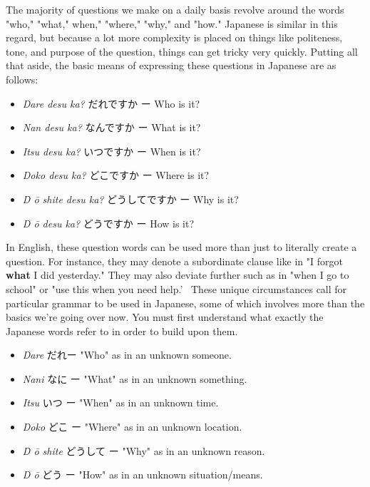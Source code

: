 \par{ The majority of questions we make on a daily basis revolve around the words "who," "what," when," "where," "why," and "how." Japanese is similar in this regard, but because a lot more complexity is placed on things like politeness, tone, and purpose of the question, things can get tricky very quickly. Putting all that aside, the basic means of expressing these questions in Japanese are as follows: }

\begin{itemize}

\item \emph{Dare desu ka? }だれですか ー Who is it? \hfill\break

\item \emph{Nan desu ka? }なんですか ー What is it? 
\item \emph{Itsu desu ka? }いつですか ー When is it? 
\item \emph{Doko desu ka? }どこですか ー Where is it? 
\item \emph{D \emph{ō }shite desu ka? }どうしてですか ー Why is it? 
\item \emph{D \emph{ō }desu ka? }どうですか ー How is it? 
\end{itemize}

\par{ In English, these question words can be used more than just to literally create a question. For instance, they may denote a subordinate clause like in "I forgot \textbf{what }I did yesterday." They may also deviate further such as in "when I go to school" or "use this when you need help.'  These unique circumstances call for particular grammar to be used in Japanese, some of which involves more than the basics we're going over now. You must first understand what exactly the Japanese words refer to in order to build upon them. }

\begin{itemize}

\item \emph{Dare }だれー "Who" as in an unknown someone. \hfill\break

\item \emph{Nani }なに ー "What" as in an unknown something. 
\item \emph{Itsu }いつ ー "When" as in an unknown time. 
\item \emph{Doko }どこ ー "Where" as in an unknown location. 
\item \emph{D \emph{ō }shite }どうして ー "Why" as in an unknown reason. 
\item \emph{D \emph{ō } }どう ー "How" as in an unknown situation\slash means. 
\end{itemize}

